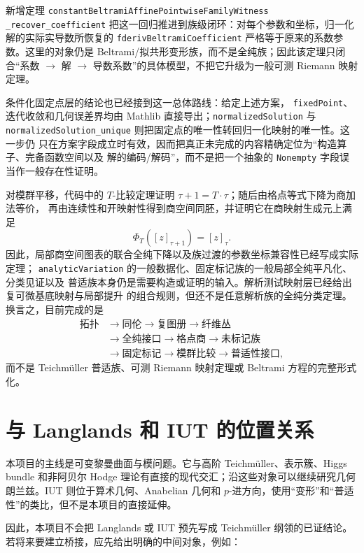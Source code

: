 \documentclass[UTF8,fontset=none,a4paper,11pt]{ctexart}
\begin{document}
新增定理
\texttt{constantBeltramiAffinePointwiseFamilyWitness}\linebreak
\texttt{\_recover\_coefficient}
把这一回归推进到族级闭环：对每个参数和坐标，归一化解的实际实导数所恢复的
\texttt{fderivBeltramiCoefficient} 严格等于原来的系数参数。这里的对象仍是
Beltrami/拟共形变形族，而不是全纯族；因此该定理只闭合“系数
\(\to\) 解 \(\to\) 导数系数”的具体模型，不把它升级为一般可测 Riemann 映射定理。

条件化固定点层的结论也已经接到这一总体路线：给定上述方案，
\texttt{fixedPoint}、迭代收敛和几何误差界均由
Mathlib 直接导出；\texttt{normalizedSolution} 与
\texttt{normalizedSolution\_unique} 则把固定点的唯一性转回归一化映射的唯一性。这一步仍
只在方案字段成立时有效，因而把真正未完成的内容精确定位为“构造算子、完备函数空间以及
解的编码/解码”，而不是把一个抽象的 \texttt{Nonempty} 字段误当作一般存在性证明。

对模群平移，代码中的 $T$-比较定理证明
\(\tau+1=T\mathbin{\cdot}\tau\)；随后由格点等式下降为商加法等价，
再由连续性和开映射性得到商空间同胚，并证明它在商映射生成元上满足
\[
  \Phi_T([z]_{\tau+1})=[z]_\tau.
\]
因此，局部商空间图表的联合全纯下降以及族过渡的参数坐标兼容性已经写成实际定理；
\texttt{analyticVariation} 的一般数据化、固定标记族的一般局部全纯平凡化、分类见证以及
普适族本身仍是需要构造或证明的输入。解析测试映射层已经给出复可微基底映射与局部提升
的组合规则，但还不是任意解析族的全纯分类定理。换言之，目前完成的是
\[
\begin{aligned}
\text{拓扑}&\to\text{同伦}\to\text{复图册}\to\text{纤维丛}\\
&\to\text{全纯接口}\to\text{格点商}\to\text{未标记族}\\
&\to\text{固定标记}\to\text{模群比较}\to\text{普适性接口},
\end{aligned}
\]
而不是 Teichmüller 普适族、可测 Riemann 映射定理或 Beltrami 方程的完整形式化。

\section{与 Langlands 和 IUT 的位置关系}

本项目的主线是可变黎曼曲面与模问题。它与高阶 Teichmüller、表示簇、Higgs bundle 和非阿贝尔 Hodge 理论有直接的现代交汇；沿这些对象可以继续研究几何朗兰兹。IUT 则位于算术几何、Anabelian 几何和 $p$-进方向，使用“变形”和“普适性”的类比，但不是本项目的直接延伸。

因此，本项目不会把 Langlands 或 IUT 预先写成 Teichmüller 纲领的已证结论。若将来要建立桥接，应先给出明确的中间对象，例如：
\end{document}
